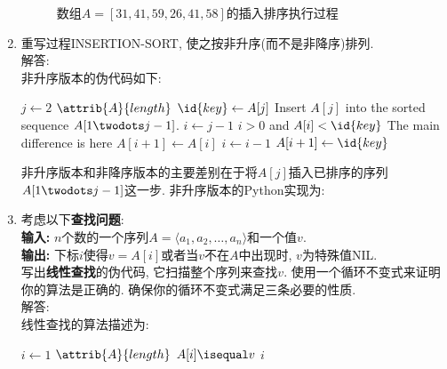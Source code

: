 \documentclass[UTF8,a4paper,zihao=-4,oneside,onecolumn,scheme=chinese,autoindent=true]{ctexbook}
\begin{document}
\begin{enumerate}
{\begin{figure}[H]
              \caption{数组$A=[31,41,59,26,41,58]$的插入排序执行过程}\label{练习221}
          \end{figure}
          }
    \item {
          重写过程INSERTION-SORT, 使之按非升序(而不是非降序)排列.\\
          解答: \\
          非升序版本的伪代码如下:
          \begin{codebox}
              \li \For $j \gets 2$ \To $\attrib{A}{length}$
              \li \Do
              $\id{key} \gets A[j]$
              \li \Comment Insert $A[j]$ into the sorted sequence
              $A[1 \twodots j-1]$.
              \li $i \gets j-1$
              \li \While $i > 0$ and $A[i] < \id{key}$ \RComment The main difference is here
              \li \Do
              $A[i+1] \gets A[i]$
              \li $i \gets i-1$
              \End
              \li $A[i+1] \gets \id{key}$
              \End
          \end{codebox}
          非升序版本和非降序版本的主要差别在于将$A[j]$插入已排序的序列$A[1 \twodots j-1]$这一步. 非升序版本的Python实现为:
          
          }
    \item {
          考虑以下\textbf{查找问题}:\\
          \textbf{输入: }$n$个数的一个序列$A=\langle a_{1},a_{2},\dots,a_{n} \rangle$和一个值$v$.\\
          \textbf{输出: }下标$i$使得$v=A[i]$或者当$v$不在$A$中出现时, $v$为特殊值NIL.\\
          写出\textbf{线性查找}的伪代码, 它扫描整个序列来查找$v$. 使用一个循环不变式来证明你的算法是正确的. 确保你的循环不变式满足三条必要的性质.\\
          解答: \\
          线性查找的算法描述为:
          \begin{codebox}
              \li \For $i \gets 1$ \To $\attrib{A}{length}$
              \li     \Do
              \If $A[i] \isequal v$
              \li         \Then \Return $i$
              \End
              \End
              \li \Return {}
          \end{codebox}

}
\end{enumerate}
\end{document}
